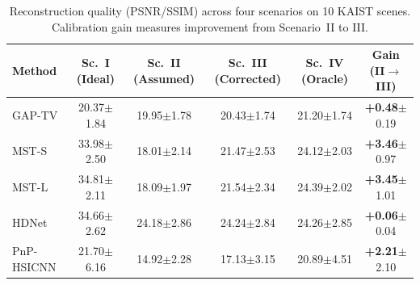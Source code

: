 \begin{table}[t]
\centering
\caption{Reconstruction quality (PSNR/SSIM) across four scenarios on 10 KAIST scenes. Calibration gain measures improvement from Scenario~II to III.}
\label{tab:main_results}
\small
\begin{tabular}{l cccc c}
\toprule
Method & Sc.~I (Ideal) & Sc.~II (Assumed) & Sc.~III (Corrected) & Sc.~IV (Oracle) & Gain (II$\to$III) \\
\midrule
GAP-TV & 20.37$\pm$1.84 & 19.95$\pm$1.78 & 20.43$\pm$1.74 & 21.20$\pm$1.74 & \textbf{+0.48}$\pm$0.19 \\
MST-S & 33.98$\pm$2.50 & 18.01$\pm$2.14 & 21.47$\pm$2.53 & 24.12$\pm$2.03 & \textbf{+3.46}$\pm$0.97 \\
MST-L & 34.81$\pm$2.11 & 18.09$\pm$1.97 & 21.54$\pm$2.34 & 24.39$\pm$2.02 & \textbf{+3.45}$\pm$1.01 \\
HDNet & 34.66$\pm$2.62 & 24.18$\pm$2.86 & 24.24$\pm$2.84 & 24.26$\pm$2.85 & \textbf{+0.06}$\pm$0.04 \\
PnP-HSICNN & 21.70$\pm$6.16 & 14.92$\pm$2.28 & 17.13$\pm$3.15 & 20.89$\pm$4.51 & \textbf{+2.21}$\pm$2.10 \\
\bottomrule
\end{tabular}
\end{table}